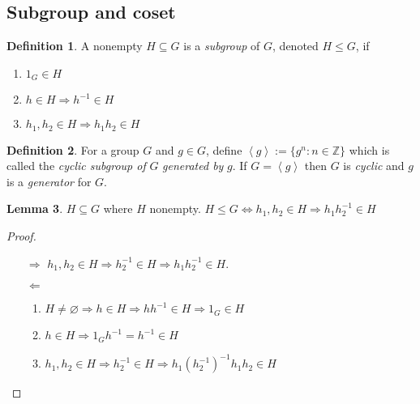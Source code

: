 \documentclass[a4paper]{article}
\newcommand{\la}{\left\langle}
\newcommand{\ra}{\right\rangle}
\newcommand{\Z}{\mathbb{Z}}
\theoremstyle{definition}
\newtheorem{defn}{Definition}[subsection]
\newtheorem{lemma}[defn]{Lemma}
\begin{document}
\subsection{Subgroup and coset}
\begin{defn}
A nonempty $H\subseteq G$ is a \textit{subgroup} of $G$, denoted $H\leq G$, if
\begin{enumerate}
\item $1_G\in H$
\item $h\in H\Rightarrow h^{-1}\in H$
\item $h_1,h_2\in H \Rightarrow h_1h_2\in H$
\end{enumerate}
\end{defn}
\begin{defn}
For a group $G$ and $g\in G$, define $\la g\ra:=\{g^n:n\in\Z\}$ which is called the \textit{cyclic subgroup of} $G$ \textit{generated by} $g$. If $G=\la g\ra$ then $G$ is \textit{cyclic} and $g$ is a \textit{generator} for $G$.
\end{defn}
\begin{lemma}
\label{lemma:sgptest}
$H\subseteq G$ where $H$ nonempty. $H\leq G \Leftrightarrow h_1,h_2\in H\Rightarrow h_1h_2^{-1}\in H$
\end{lemma}
\begin{proof}
\begin{itemize}
\item[$\Rightarrow$] $h_1,h_2\in H\Rightarrow h_2^{-1}\in H\Rightarrow h_1h_2^{-1}\in H$.
\item[$\Leftarrow$] \begin{enumerate}
\item $H\neq \varnothing\Rightarrow h\in H\Rightarrow hh^{-1}\in H\Rightarrow 1_G\in H$
\item $h\in H\Rightarrow 1_Gh^{-1}=h^{-1}\in H$
\item $h_1,h_2\in H\Rightarrow h_2^{-1}\in H\Rightarrow h_1(h_2^{-1})^{-1}h_1h_2\in H$
\end{enumerate}
\end{itemize}
\end{proof}
\end{document}
